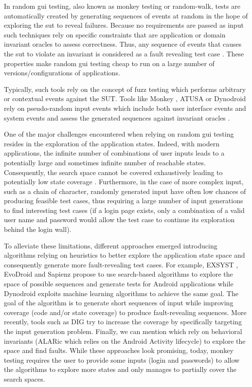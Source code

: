 In random \gls{gui} testing, also known as monkey testing or random-walk, tests are automatically created by generating sequences of events at random in the hope of exploring the \gls{sut} to reveal failures. Because no requirements are passed as input such techniques rely on specific constraints that are application or domain invariant oracles \cite{Mesbah2009} to assess correctness. Thus, any sequence of events that causes the \gls{sut} to violate an invariant is considered as a fault revealing test case \cite{Barr2015}. These properties make random \gls{gui} testing cheap to run on a large number of versions/configurations of applications.

Typically, such tools rely on the concept of fuzz testing which performs arbitrary or contextual events against the SUT. Tools like Monkey \cite{Google2020},  ATUSA \cite{Mesbah2012} or Dynodroid \cite{Machiry2013} rely on pseudo-random input events which include both user interface events and system events and assess the generated sequences against invariant oracles \cite{Amalfitano2011}. 

One of the major challenges encountered when relying on random \gls{gui} testing resides in the exploration of the application states. Indeed, with modern applications, the infinite number of combinations of user inputs leads to a potentially large and sometimes infinite number of reachable states. Consequently, the search space cannot be covered exhaustively leading to potentially low state coverage \cite{Canny2019}. Furthermore, in the case of more complex input, such as a chain of character, randomly generated input have often low chances of producing feasible test cases, thus requiring a large number of input generations to find interesting test cases (\eg if a login page exists, only a combination of a valid user name and password would allow the test case to continue its exploration behind the login wall).

To alleviate these limitations, different approaches emerged introducing algorithms relying on heuristics to better explore the application state space and consequently generate more fault-revealing test cases. For example, EXSYST \cite{Gross2012}, EvoDroid \cite{Mahmood2014} and Sapienz \cite{Mao2016} propose to use search-based algorithms to explore the space of possible sequences and generate tests for Android applications while Dynodroid \cite{Machiry2013} exploits machine learning algorithms to achieve the same goal. The goal of the algorithm is to generate short sequences of input while improving coverage (code \cite{Gross2012} and/or state \cite{Machiry2013} coverage) to produce fault-revealing sequences. More recently, tools such as DIG \cite{Biagiola2019} try to increase the coverage by specifically targeting the input generation problem. Finally, we can mention which rely on behavioral invariants (\eg ALARic \cite{Riccio2018} which relies on the Android Activity lifecycle) to explore the space and find faults. While these approaches look promising, today, monkey testing requires the user to provide some inputs (\eg login and passwords) to allow the algorithms to explore more states and only manages to partially cover the search spaces.

